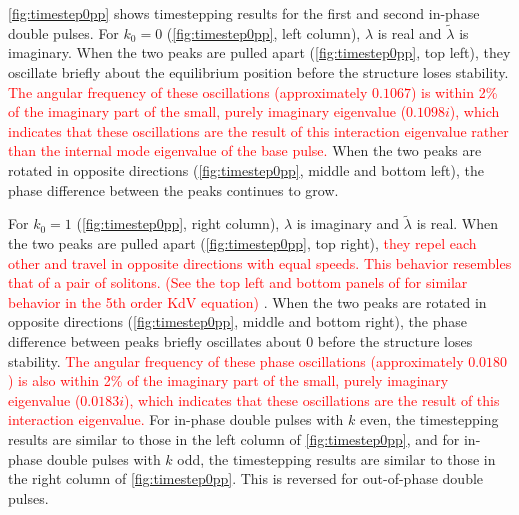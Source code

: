\documentclass[12pt]{elsarticle}
\newcommand{\revised}[1]{ \textcolor{red}{#1} }
\begin{document}
\cref{fig:timestep0pp} shows timestepping results for the first and second in-phase double pulses. For $k_0 = 0$ (\cref{fig:timestep0pp}, left column), $\lambda$ is real and $\tilde{\lambda}$ is imaginary. When the two peaks are pulled apart (\cref{fig:timestep0pp}, top left), they oscillate briefly about the equilibrium position before the structure loses stability. \revised{The angular frequency of these oscillations (approximately $0.1067$) is within 2\% of the imaginary part of the small, purely imaginary eigenvalue ($0.1098i$), which indicates that these oscillations are the result of this interaction eigenvalue rather than the internal mode eigenvalue of the base pulse.} When the two peaks are rotated in opposite directions (\cref{fig:timestep0pp}, middle and bottom left), the phase difference between the peaks continues to grow. 

For $k_0 = 1$ (\cref{fig:timestep0pp}, right column), $\lambda$ is imaginary and $\tilde{\lambda}$ is real. When the two peaks are pulled apart (\cref{fig:timestep0pp}, top right), \revised{they repel each other and travel in opposite directions with equal speeds. This behavior resembles that of a pair of solitons. (See the top left and bottom panels of \cite[Figure 9]{Pelinovsky2007} for similar behavior in the 5th order KdV equation)}. When the two peaks are rotated in opposite directions (\cref{fig:timestep0pp}, middle and bottom right), the phase difference between peaks briefly oscillates about 0 before the structure loses stability. \revised{The angular frequency of these phase oscillations (approximately $0.0180$) is also within 2\% of the imaginary part of the small, purely imaginary eigenvalue ($0.0183i$), which indicates that these oscillations are the result of this interaction eigenvalue.} For in-phase double pulses with $k$ even, the timestepping results are similar to those in the left column of \cref{fig:timestep0pp}, and for in-phase double pulses with $k$ odd, the timestepping results are similar to those in the right column of \cref{fig:timestep0pp}. This is reversed for out-of-phase double pulses.
\end{document}
